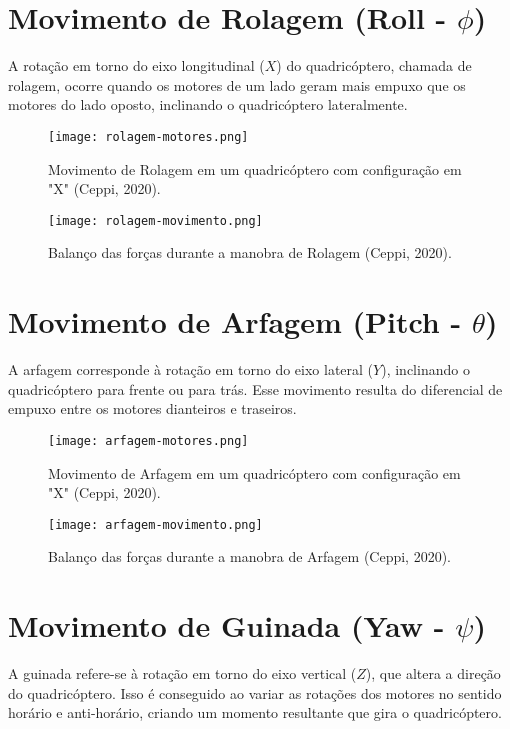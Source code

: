 \section{Movimento de Rolagem (Roll - $\phi$)}
A rotação em torno do eixo longitudinal ($X$) do quadricóptero, chamada de rolagem, ocorre quando os motores de um lado geram mais empuxo que os motores do lado oposto, inclinando o quadricóptero lateralmente.

\begin{figure}[H]
	\centering
	\texttt{[image: rolagem-motores.png]}
	\caption{Movimento de Rolagem em um quadricóptero com configuração em "X" (Ceppi, 2020).}
	\label{fig:roll_maneuver}
\end{figure}

\begin{figure}[H]
	\centering
	\texttt{[image: rolagem-movimento.png]} %
	\caption{Balanço das forças durante a manobra de Rolagem (Ceppi, 2020).}
	\label{fig:roll_maneuver_forces}
\end{figure}



\section{Movimento de Arfagem (Pitch - $\theta$)}
A arfagem corresponde à rotação em torno do eixo lateral ($Y$), inclinando o quadricóptero para frente ou para trás. Esse movimento resulta do diferencial de empuxo entre os motores dianteiros e traseiros.

\begin{figure}[H]
	\centering
	\texttt{[image: arfagem-motores.png]}
	\caption{Movimento de Arfagem em um quadricóptero com configuração em "X" (Ceppi, 2020).}
	\label{fig:pitch_maneuver}
\end{figure}

\begin{figure}[H]
	\centering
	\texttt{[image: arfagem-movimento.png]} %
	\caption{Balanço das forças durante a manobra de Arfagem (Ceppi, 2020).}
	\label{fig:pitch_maneuver_forces}
\end{figure}



\section{Movimento de Guinada (Yaw - $\psi$)}
A guinada refere-se à rotação em torno do eixo vertical ($Z$), que altera a direção do quadricóptero. Isso é conseguido ao variar as rotações dos motores no sentido horário e anti-horário, criando um momento resultante que gira o quadricóptero.

